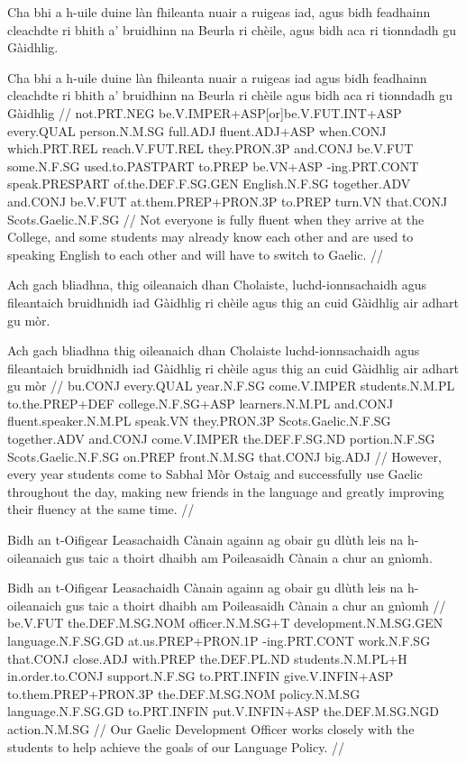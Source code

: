 \documentclass[a4paper,10pt]{article}
\begin{document}
\ex
\begingl
\glpre Cha bhi a h-uile duine làn fhileanta nuair a ruigeas iad, agus bidh feadhainn cleachdte ri bhith a' bruidhinn na Beurla ri chèile, agus bidh aca ri tionndadh gu Gàidhlig. 

\vspace{4mm}
\gla Cha bhi {a h-uile} duine làn fhileanta nuair a ruigeas iad agus bidh feadhainn cleachdte ri bhith a' bruidhinn na Beurla {ri chèile} agus bidh aca ri tionndadh gu Gàidhlig  //
\glb not.PRT.NEG be.V.IMPER+ASP[or]be.V.FUT.INT+ASP every.QUAL person.N.M.SG full.ADJ fluent.ADJ+ASP when.CONJ which.PRT.REL reach.V.FUT.REL they.PRON.3P and.CONJ be.V.FUT some.N.F.SG used.to.PASTPART to.PREP be.VN+ASP -ing.PRT.CONT speak.PRESPART of.the.DEF.F.SG.GEN English.N.F.SG together.ADV and.CONJ be.V.FUT at.them.PREP+PRON.3P to.PREP turn.VN that.CONJ Scots.Gaelic.N.F.SG  //
\glft Not everyone is fully fluent when they arrive at the College, and some students may already know each other and are used to speaking English to each other and will have to switch to Gaelic. //
\endgl
\xe

\ex
\begingl
\glpre Ach gach bliadhna, thig oileanaich dhan Cholaiste, luchd-ionnsachaidh agus fileantaich bruidhnidh iad Gàidhlig ri chèile agus thig an cuid Gàidhlig air adhart gu mòr. 

\vspace{4mm}
\gla Ach gach bliadhna thig oileanaich dhan Cholaiste luchd-ionnsachaidh agus fileantaich bruidhnidh iad Gàidhlig {ri chèile} agus thig an cuid Gàidhlig air adhart gu mòr  //
\glb bu.CONJ every.QUAL year.N.F.SG come.V.IMPER students.N.M.PL to.the.PREP+DEF college.N.F.SG+ASP learners.N.M.PL and.CONJ fluent.speaker.N.M.PL speak.VN they.PRON.3P Scots.Gaelic.N.F.SG together.ADV and.CONJ come.V.IMPER the.DEF.F.SG.ND portion.N.F.SG Scots.Gaelic.N.F.SG on.PREP front.N.M.SG that.CONJ big.ADJ  //
\glft However, every year students come to Sabhal Mòr Ostaig and successfully use Gaelic throughout the day, making new friends in the language and greatly improving their fluency at the same time. //
\endgl
\xe

\ex
\begingl
\glpre Bidh an t-Oifigear Leasachaidh Cànain againn ag obair gu dlùth leis na h-oileanaich gus taic a thoirt dhaibh am Poileasaidh Cànain a chur an gnìomh. 

\vspace{4mm}
\gla Bidh an t-Oifigear Leasachaidh Cànain againn ag obair gu dlùth leis na h-oileanaich gus taic a thoirt dhaibh am Poileasaidh Cànain a chur an gnìomh  //
\glb be.V.FUT the.DEF.M.SG.NOM officer.N.M.SG+T development.N.M.SG.GEN language.N.F.SG.GD at.us.PREP+PRON.1P -ing.PRT.CONT work.N.F.SG that.CONJ close.ADJ with.PREP the.DEF.PL.ND students.N.M.PL+H in.order.to.CONJ support.N.F.SG to.PRT.INFIN give.V.INFIN+ASP to.them.PREP+PRON.3P the.DEF.M.SG.NOM policy.N.M.SG language.N.F.SG.GD to.PRT.INFIN put.V.INFIN+ASP the.DEF.M.SG.NGD action.N.M.SG  //
\glft Our Gaelic Development Officer works closely with the students to help achieve the goals of our Language Policy. //
\endgl
\xe
\end{document}
